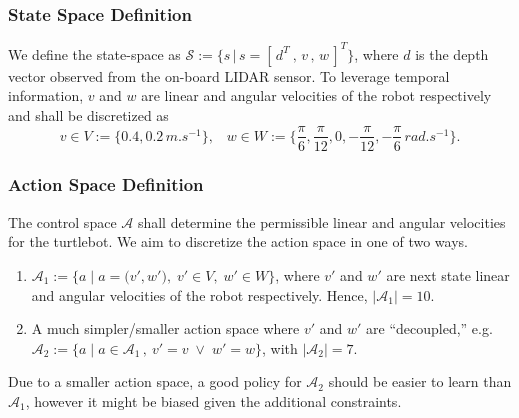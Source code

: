 \documentclass{article}
\begin{document}
\subsubsection{State Space Definition}
We define the state-space as $\mathcal{S} := \big\{ s\,\big\vert \, s= [\,d^T\:,\,v\,,\,w\,]^T \big\}$, where $d$ is the depth vector observed from the on-board LIDAR sensor. To leverage temporal information, $v$ and $w$ are linear and angular velocities of the robot respectively and shall be discretized as
    \begin{equation*}
      v\in V := \big\{ 0.4, 0.2\,\si{m.s^{-1}}\big\}, \;\;\;w\in W:=\big\{ \frac{\pi}{6}, \frac{\pi}{12}, 0, -\frac{\pi}{12}, -\frac{\pi}{6}\,\si{rad.s^{-1}}\big\}.
    \end{equation*}

\subsubsection{Action Space Definition}
The control space $\mathcal{A}$ shall determine the permissible linear and angular velocities for the turtlebot. We aim to discretize the action space in one of two ways.
\begin{enumerate}
    \item $\mathcal{A}_1 := \Big\{ a \;\Big\vert\; a = \big(v', w'\big), \;v'\in V, \;w'\in W \Big\}$, where $v'$ and $w'$ are next state linear and angular velocities of the robot respectively. Hence, $\vert \mathcal{A}_1 \vert = 10$.
    \item A much simpler/smaller action space where $v'$ and $w'$ are ``decoupled,'' e.g. $\mathcal{A}_2 := \big\{ a\; \big\vert \;a \in \mathcal{A}_1\,,\: v' = v \;\lor\; w' = w \big\}$, with $\vert \mathcal{A}_2 \vert = 7$.
\end{enumerate}
Due to a smaller action space, a good policy for $\mathcal{A}_2$ should be easier to learn than $\mathcal{A}_1$, however it might be biased given the additional constraints.
\end{document}
